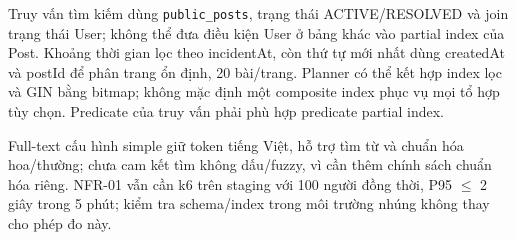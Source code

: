 Truy vấn tìm kiếm dùng \texttt{public\_posts}, trạng thái ACTIVE/RESOLVED và join trạng thái User; không thể đưa điều kiện User ở bảng khác vào partial index của Post. Khoảng thời gian lọc theo incidentAt, còn thứ tự mới nhất dùng createdAt và postId để phân trang ổn định, 20 bài/trang. Planner có thể kết hợp index lọc và GIN bằng bitmap; không mặc định một composite index phục vụ mọi tổ hợp tùy chọn. Predicate của truy vấn phải phù hợp predicate partial index.

Full-text cấu hình simple giữ token tiếng Việt, hỗ trợ tìm từ và chuẩn hóa hoa/thường; chưa cam kết tìm không dấu/fuzzy, vì cần thêm chính sách chuẩn hóa riêng. NFR-01 vẫn cần k6 trên staging với 100 người đồng thời, P95 $\leq$ 2 giây trong 5 phút; kiểm tra schema/index trong môi trường nhúng không thay cho phép đo này.

